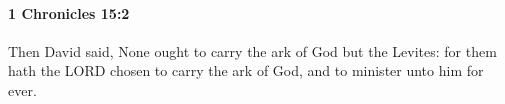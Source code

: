 
		\paragraph{1 Chronicles 15:2} %
			\label{1CHRONICLES-15-2}

			Then David said, None ought to carry the ark of God but the Levites: for them hath the LORD chosen to carry the ark of God, and to minister unto him for ever.


